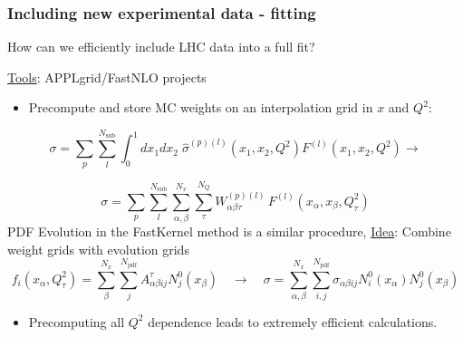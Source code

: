 \documentclass[10pt]{beamer}
\newcommand{\be}{\begin{equation*}}
\newcommand{\ee}{\end{equation*}}
\begin{document}
 \begin{frame}
\frametitle{Including new experimental data - fitting}
How can we efficiently include LHC data into a full fit?

\underline{Tools}: APPLgrid/FastNLO projects 

\begin{itemize}
\item<1-> Precompute and store MC weights on an interpolation grid in $x$ and $Q^2$:
\end{itemize}
 \be \sigma= \sum_p \sum_{l}^{N_{\mathrm{sub}}} \int_0^1 dx_1dx_2\; \hat{\sigma}^{(p)(l)} \left( x_1,x_2,Q^2 \right)  F^{(l)}\left(x_1, x_2,  Q^2 \right) \to \ee

\begin{equation}
\label{eq:applconv}
\sigma = \sum_p \sum_{l}^{N_{\mathrm{sub}}} \sum_{\alpha,\beta}^{N_x} \sum_{\tau}^{N_{Q}}
W_{\alpha\beta\tau}^{(p)(l)} \,
F^{(l)}\left(x_{\alpha}, x_{\beta},  Q^2_{\tau}\right)
\end{equation}
PDF Evolution in the FastKernel method is a similar procedure,
\underline{Idea}: Combine weight grids with evolution grids 
\be f_i(x_{\alpha},Q^2_\tau) =  \sum_\beta^{N_{x}} \sum_{j}^{N_{\mathrm{pdf}}} A^{\tau}_{\alpha\beta ij}N^0_j(x_{\beta} ) \quad \to \quad
 \sigma= \sum_{\alpha,\beta}^{N_x}\sum_{i,j}^{N_{\mathrm{pdf}}} \sigma_{\alpha\beta i j}N_i^0(x_\alpha)N_j^0(x_\beta)
\ee 
 \begin{itemize}
\item<1-> Precomputing all $Q^2$ dependence leads to extremely efficient calculations.
\end{itemize}\end{frame}
\end{document}
